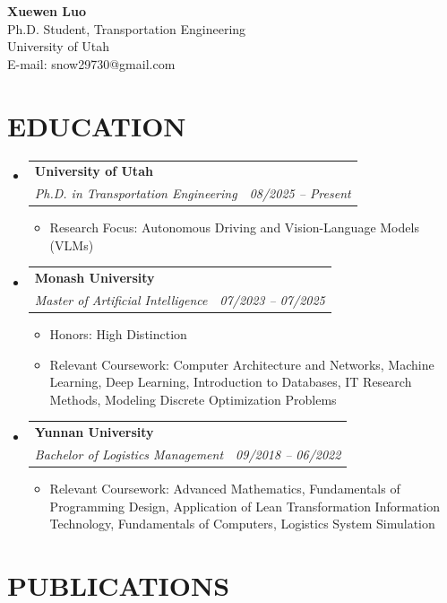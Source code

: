 \documentclass[letterpaper,11pt]{article}
\makeatletter
\newcommand{\resumeItem}[1]{
  \item\small{
    {#1 \vspace{-2pt}}
  }
}
\newcommand{\resumeSubheading}[4]{
  \vspace{-2pt}\item
    \begin{tabular*}{0.97\textwidth}[t]{l@{\extracolsep{\fill}}r}
      \textbf{#1} & #2 \\
      \textit{\small#3} & \textit{\small #4} \\
    \end{tabular*}\vspace{-7pt}
}
\newcommand{\resumeSubHeadingListStart}{\begin{itemize}[leftmargin=0.15in, label={}]}
\newcommand{\resumeSubHeadingListEnd}{\end{itemize}}
\newcommand{\resumeItemListStart}{\begin{itemize}}
\newcommand{\resumeItemListEnd}{\end{itemize}\vspace{-5pt}}
\makeatother
\begin{document}
\begin{center}
    \textbf{\Large Xuewen Luo} \\ \vspace{2pt}
    Ph.D. Student, Transportation Engineering \\
    University of Utah\\
    E-mail: {snow29730@gmail.com}
\end{center}


\section{\textbf{EDUCATION}}
  \resumeSubHeadingListStart
    \resumeSubheading
    {University of Utah}{}
    {Ph.D. in Transportation Engineering}{08/2025 -- Present}
    \resumeItemListStart
    \resumeItem{Research Focus: Autonomous Driving and Vision-Language Models (VLMs)}
    \resumeItemListEnd

    \resumeSubheading
      {Monash University}{}
      {Master of Artificial Intelligence}{07/2023 -- 07/2025}
      \resumeItemListStart
      \resumeItem{Honors: High Distinction}
      \resumeItem{Relevant Coursework: Computer Architecture and Networks, Machine Learning, Deep Learning, Introduction to Databases, IT Research Methods, Modeling Discrete Optimization Problems}
      \resumeItemListEnd

    \resumeSubheading
      {Yunnan University}{}
      {Bachelor of Logistics Management}{09/2018 -- 06/2022}
      \resumeItemListStart
      \resumeItem{Relevant Coursework: Advanced Mathematics, Fundamentals of Programming Design, Application of Lean Transformation Information Technology, Fundamentals of Computers, Logistics System Simulation}
      \resumeItemListEnd
  \resumeSubHeadingListEnd

\vspace{5pt}

\section{\textbf{PUBLICATIONS}}
\end{document}
